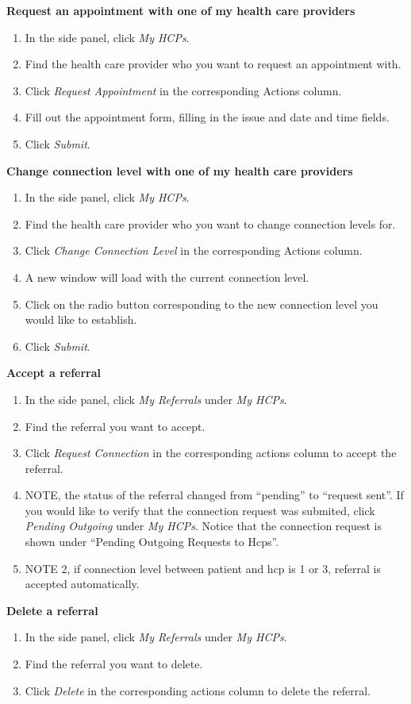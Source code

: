 \textbf{Request an appointment with one of my health care providers}
\begin{enumerate}
\item In the side panel, click \textit{My HCPs}.
\item Find the health care provider who you want to request an appointment with.
\item Click \textit{Request Appointment} in the corresponding Actions column.
\item Fill out the appointment form, filling in the issue and date and time fields.
\item Click \textit{Submit}.
\end{enumerate}
\textbf{Change connection level with one of my health care providers}
\begin{enumerate}
\item In the side panel, click \textit{My HCPs}.
\item Find the health care provider who you want to change connection levels for.
\item Click \textit{Change Connection Level} in the corresponding Actions column.
\item A new window will load with the current connection level.
\item Click on the radio button corresponding to the new connection level you would like to establish.
\item Click \textit{Submit}.
\end{enumerate}
\textbf{Accept a referral}
\begin{enumerate}
\item In the side panel, click \textit{My Referrals} under \textit{My HCPs}.
\item Find the referral you want to accept.
\item Click \textit{Request Connection} in the corresponding actions column to accept the referral.
\item NOTE, the status of the referral changed from ``pending'' to ``request sent''. If you would like to verify that the connection request was submited, click \textit{Pending Outgoing} under \textit{My HCPs}.  Notice that the connection request is shown under ``Pending Outgoing Requests to Hcps''.
\item NOTE 2, if connection level between patient and hcp is 1 or 3, referral is accepted automatically.
\end{enumerate}
\textbf{Delete a referral}
\begin{enumerate}
\item In the side panel, click \textit{My Referrals} under \textit{My HCPs}.
\item Find the referral you want to delete.
\item Click \textit{Delete} in the corresponding actions column to delete the referral.
\end{enumerate}
